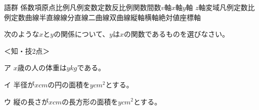 \documentclass[
  12pt,a4paper,lualatex,ja=standard]{bxjsarticle}
\begin{document}
\begin{flushleft}
\begin{itembox}[l]{語群}
係数\hspace{1.5em}項\hspace{1.5em}原点\hspace{1.5em}比例\hspace{1.5em}凡例\hspace{1.5em}変数\hspace{1.5em}定数\hspace{1.5em}反比例\hspace{1.5em}関数\hspace{1.5em}間数\hspace{1.5em}$v$軸\hspace{1.5em}$x$軸\hspace{1.5em}$y$軸\hspace{1.5em} $z$軸\hspace{1.5em}変域\hspace{1.5em}凡例定数\hspace{1.5em}比例定数\hspace{1.5em}曲線\hspace{1.5em}半直線\hspace{1.5em}線分\hspace{1.5em}直線\hspace{1.5em}二曲線\hspace{1.5em}双曲線\hspace{1.5em}縦軸\hspace{1.5em}横軸\hspace{1.5em}絶対値\hspace{1.5em}座標軸
\end{itembox}



\newpage

\noindent{} \hspace{1pt}次のような$x$と$y$の関係について、$y$は$x$の関数であるものを選びなさい。

%
\begin{flushright}%
\footnotesize{＜知・技2点＞}%
\end{flushright}%


ア\hspace{1em} $x$歳の人の体重は$y\si{kg}$である。

イ\hspace{1em} 半径が$x \si{cm}$の円の面積を$y \si{cm}^2$とする。

ウ\hspace{1em} 縦の長さが$x \si{cm}$の長方形の面積を$y \si{cm}^2$とする。


\end{flushleft}
\end{document}
